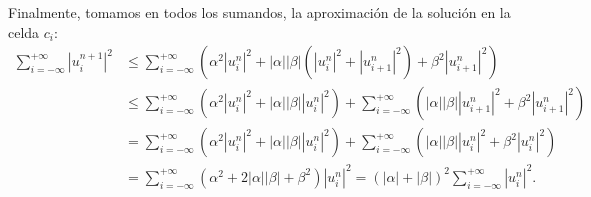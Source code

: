 \begin{frame}
    \frametitle{\secname}

    \begin{proofs}
        Finalmente, tomamos en todos los sumandos, la aproximación de la
        solución en la celda $c_{i}$:
        \vspace*{-.5\baselineskip}\setlength\belowdisplayshortskip{0pt}
        \begin{align*}
            \sum_{i=-\infty}^{+\infty}
            {\left|u^{n+1}_{i}\right|}^{2} & \leq
            \sum_{i=-\infty}^{+\infty}
            \left(
            \alpha^{2}
            {\left|u^{n}_{i}\right|}^{2}+
            \left|\alpha\right|
            \left|\beta\right|
            \left(
            \left|u^{n}_{i}\right|^{2}+
            \left|u^{n}_{i+1}\right|^{2}
            \right)+
            \beta^{2}
            {\left|u^{n}_{i+1}\right|}^{2}
            \right)                               \\
                                           & \leq
            \sum_{i=-\infty}^{+\infty}
            \left(
            \alpha^{2}
            \left|u^{n}_{i}\right|^{2}+
            \left|\alpha\right|
            \left|\beta\right|
            {\left|u^{n}_{i}\right|}^{2}
            \right)+
            \sum_{i=-\infty}^{+\infty}
            \left(
            \left|\alpha\right|
            \left|\beta\right|
            {\left|u^{n}_{i+1}\right|}^{2}+
            \beta^{2}
            {\left|u^{n}_{i+1}\right|}^{2}
            \right)                               \\
                                           & =
            \sum_{i=-\infty}^{+\infty}
            \left(
            \alpha^{2}
            {\left|u^{n}_{i}\right|}^{2}+
            \left|\alpha\right|
            \left|\beta\right|
            \left|u^{n}_{i}\right|^{2}
            \right)+
            \sum_{i=-\infty}^{+\infty}
            \left(
            \left|\alpha\right|
            \left|\beta\right|
            \left|u^{n}_{i}\right|^{2}+
            \beta^{2}
            {\left|u^{n}_{i}\right|}^{2}
            \right)                               \\
                                           & =
            \sum_{i=-\infty}^{+\infty}
            \left(
            \alpha^{2}+
            2\left|\alpha\right|
            \left|\beta\right|+
            \beta^{2}
            \right)
            \left|u^{n}_{i}\right|^{2}=
                {\left(\left|\alpha\right|+\left|\beta\right|\right)}^{2}
            \sum_{i=-\infty}^{+\infty}
            {\left|u^{n}_{i}\right|}^{2}.
        \end{align*}
    \end{proofs}
\end{frame}

